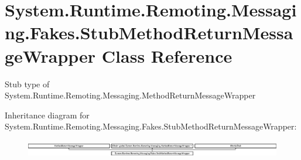 \hypertarget{class_system_1_1_runtime_1_1_remoting_1_1_messaging_1_1_fakes_1_1_stub_method_return_message_wrapper}{\section{System.\-Runtime.\-Remoting.\-Messaging.\-Fakes.\-Stub\-Method\-Return\-Message\-Wrapper Class Reference}
\label{class_system_1_1_runtime_1_1_remoting_1_1_messaging_1_1_fakes_1_1_stub_method_return_message_wrapper}
}


Stub type of System.\-Runtime.\-Remoting.\-Messaging.\-Method\-Return\-Message\-Wrapper 


Inheritance diagram for System.\-Runtime.\-Remoting.\-Messaging.\-Fakes.\-Stub\-Method\-Return\-Message\-Wrapper\-:\begin{figure}[H]
\begin{center}
\leavevmode
\includegraphics[height=0.745176cm]{class_system_1_1_runtime_1_1_remoting_1_1_messaging_1_1_fakes_1_1_stub_method_return_message_wrapper}
\end{center}
\end{figure}
